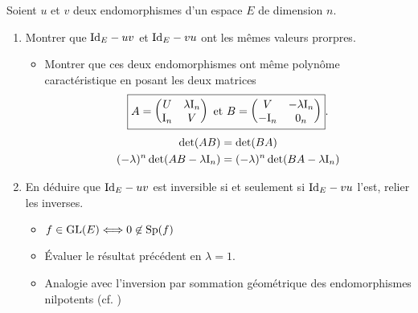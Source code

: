 Soient $u$ et $v$ deux endomorphismes d'un espace $E$ de dimension $n$.

\begin{enumerate}
    \item Montrer que $\mathrm{Id}_E-uv$ et $\mathrm{Id}_E-vu$ ont les mêmes valeurs prorpres.
    \begin{itemize}
        \item Montrer que ces deux endomorphismes ont même polynôme caractéristique en posant les deux matrices
        $$
        \boxed{
        A = 
        \begin{pmatrix}
            U & \lambda \mathrm{I}_n \\
            \mathrm{I}_n & V
        \end{pmatrix}
        \text{ et }
        B = 
        \begin{pmatrix}
            V & -\lambda \mathrm{I}_n \\
            -\mathrm{I}_n & 0_n
        \end{pmatrix}
        }.
        $$
        \begin{align*}
            \det(AB) &= \det(BA) \\
            (-\lambda)^n \det(AB - \lambda \mathrm{I}_n) &= (-\lambda)^n \det(BA - \lambda \mathrm{I}_n)
        \end{align*}
    \end{itemize}
    \item En déduire que $\mathrm{Id}_E-uv$ est inversible si et seulement si $\mathrm{Id}_E-vu$ l'est, relier les inverses. 
    \begin{itemize}
        \item $f \in \mathrm{GL}(E) \Longleftrightarrow 0 \not \in \mathrm{Sp}(f)$
        \item Évaluer le résultat précédent en $\lambda = 1$.
        \item Analogie avec l'inversion par sommation géométrique des endomorphismes nilpotents (cf. )
    \end{itemize}
\end{enumerate}